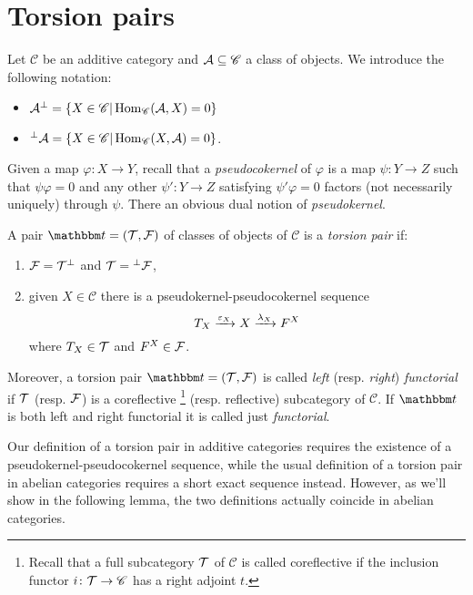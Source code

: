 \section{Torsion pairs}

Let $\mathscr{C}$ be an additive category and $\mathcal{A}\subseteq \mathscr{C}$ a class of objects. We introduce the following notation:
\begin{itemize}
  \item $\mathcal{A}^\perp = \{X\in\mathscr{C}| \operatorname{Hom}_{\mathscr{C}}(\mathcal{A},X)=0\}$
  \item ${^\perp \mathcal{A}}=\{ X\in \mathscr{C}| \operatorname{Hom}_{\mathscr{C}}(X,\mathcal{A})=0\}$.
\end{itemize}

Given a map $\varphi:X\to Y$, recall that a \emph{pseudocokernel} of $\varphi$ is a map $\psi:Y\to Z$ such that $\psi\varphi=0$ and any other $\psi':Y\to Z$ satisfying $\psi'\varphi=0$ factors (not necessarily uniquely) through $\psi$. There an obvious dual notion of \emph{pseudokernel}.

\begin{definition}\label{5:def:torsion_pair}
  A pair $\t=(\T,\F)$ of classes of objects of $\mathscr{C}$ is a \emph{torsion pair} if:
  \begin{enumerate}
    \item $\mathcal{F}=\mathcal{T}^\perp$ and $\mathcal{T} = {^\perp \mathcal{F}}$,
    \item given $X\in \mathscr{C}$ there is a pseudokernel-pseudocokernel sequence
      \begin{equation*}
        T_X\xrightarrow{\varepsilon_X} X\xrightarrow{\lambda_X} F^X
      \end{equation*}
      where $T_X\in\mathcal{T}$ and $F^X\in\mathcal{F}$.
  \end{enumerate}
  Moreover, a torsion pair $\t=(\T,\F)$ is called \emph{left} (resp. \emph{right}) \emph{functorial} if $\mathcal{T}$ (resp. $\mathcal{F}$) is a coreflective
  \footnote{Recall that a full subcategory $\mathcal{T}$ of $\mathscr{C}$ is called coreflective if the inclusion functor $i\colon\mathcal{T}\to \mathscr{C}$ has a right adjoint $t$.}
  (resp. reflective) subcategory of $\mathscr{C}$. If $\t$ is both left and right functorial it is called just \emph{functorial}.
\end{definition}

\begin{rmk}
  Our definition of a torsion pair in additive categories requires the existence of a pseudokernel-pseudocokernel sequence, while the usual definition of a torsion pair in abelian categories requires a short exact sequence instead. However, as we'll show in the following lemma, the two definitions actually coincide in abelian categories.
\end{rmk}


